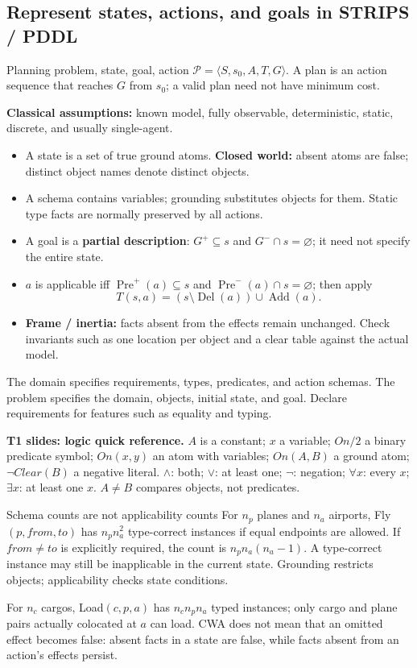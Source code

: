 \documentclass[10pt,a4paper]{article}
\newcommand{\Pre}{\operatorname{Pre}}
\newcommand{\Add}{\operatorname{Add}}
\newcommand{\Del}{\operatorname{Del}}
\begin{document}
\subsection{Represent states, actions, and goals in STRIPS / PDDL}
\begin{card}{Planning problem, state, goal, action}
$\mathcal P=\langle S,s_0,A,T,G\rangle$. A plan is an action sequence that reaches $G$ from $s_0$; a valid plan need not have minimum cost.

\textbf{Classical assumptions:} known model, fully observable, deterministic, static, discrete, and usually single-agent.
\begin{itemize}
\item A state is a set of true ground atoms. \textbf{Closed world:} absent atoms are false; distinct object names denote distinct objects.
\item A schema contains variables; grounding substitutes objects for them. Static type facts are normally preserved by all actions.
\item A goal is a \textbf{partial description}: $G^+\subseteq s$ and $G^-\cap s=\varnothing$; it need not specify the entire state.
\item $a$ is applicable iff $\Pre^+(a)\subseteq s$ and $\Pre^-(a)\cap s=\varnothing$; then apply
\[
\boxed{T(s,a)=(s\setminus\Del(a))\cup\Add(a).}
\]
\item \textbf{Frame / inertia:} facts absent from the effects remain unchanged. Check invariants such as one location per object and a clear table against the actual model.
\end{itemize}
The domain specifies requirements, types, predicates, and action schemas. The problem specifies the domain, objects, initial state, and goal. Declare requirements for features such as equality and typing.
\end{card}

\begin{plain}
\textbf{T1 slides: logic quick reference.} $A$ is a constant; $x$ a variable; $On/2$ a binary predicate symbol; $On(x,y)$ an atom with variables; $On(A,B)$ a ground atom; $\neg Clear(B)$ a negative literal.
$\land$: both; $\lor$: at least one; $\neg$: negation; $\forall x$: every $x$; $\exists x$: at least one $x$. $A\ne B$ compares objects, not predicates.
\end{plain}

\begin{card}{Schema counts are not applicability counts}
For $n_p$ planes and $n_a$ airports, Fly$(p,from,to)$ has $n_pn_a^2$ type-correct instances if equal endpoints are allowed. If $from\ne to$ is explicitly required, the count is $n_pn_a(n_a-1)$. A type-correct instance may still be inapplicable in the current state. Grounding restricts objects; applicability checks state conditions.

For $n_c$ cargos, Load$(c,p,a)$ has $n_cn_pn_a$ typed instances; only cargo and plane pairs actually colocated at $a$ can load. CWA does not mean that an omitted effect becomes false: absent facts in a state are false, while facts absent from an action's effects persist.
\end{card}
\end{document}
